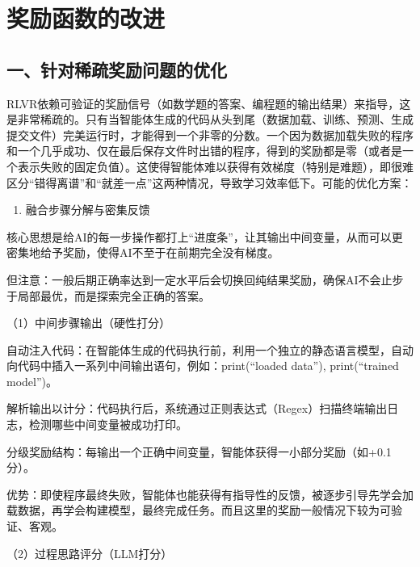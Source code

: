 \clearpage

\hypertarget{ux5956ux52b1ux51fdux6570ux7684ux6539ux8fdb}{%
\section{奖励函数的改进}\label{ux5956ux52b1ux51fdux6570ux7684ux6539ux8fdb}}

\hypertarget{ux4e00ux9488ux5bf9ux7a00ux758fux5956ux52b1ux95eeux9898ux7684ux4f18ux5316}{%
\subsection{一、针对稀疏奖励问题的优化}\label{ux4e00ux9488ux5bf9ux7a00ux758fux5956ux52b1ux95eeux9898ux7684ux4f18ux5316}}

RLVR依赖可验证的奖励信号（如数学题的答案、编程题的输出结果）来指导，这是非常稀疏的。只有当智能体生成的代码从头到尾（数据加载、训练、预测、生成提交文件）完美运行时，才能得到一个非零的分数。一个因为数据加载失败的程序和一个几乎成功、仅在最后保存文件时出错的程序，得到的奖励都是零（或者是一个表示失败的固定负值）。这使得智能体难以获得有效梯度（特别是难题），即很难区分``错得离谱''和``就差一点''这两种情况，导致学习效率低下。可能的优化方案：

\begin{enumerate}
\def\labelenumi{\arabic{enumi}.}
\tightlist
\item
  融合步骤分解与密集反馈
\end{enumerate}

核心思想是给AI的每一步操作都打上``进度条''，让其输出中间变量，从而可以更密集地给予奖励，使得AI不至于在前期完全没有梯度。

但注意：一般后期正确率达到一定水平后会切换回纯结果奖励，确保AI不会止步于局部最优，而是探索完全正确的答案。

（1）中间步骤输出（硬性打分）

自动注入代码：在智能体生成的代码执行前，利用一个独立的静态语言模型，自动向代码中插入一系列中间输出语句，例如：print(``loaded data''), print(``trained model'')。

解析输出以计分：代码执行后，系统通过正则表达式（Regex）扫描终端输出日志，检测哪些中间变量被成功打印。

分级奖励结构：每输出一个正确中间变量，智能体获得一小部分奖励（如+0.1分）。

优势：即使程序最终失败，智能体也能获得有指导性的反馈，被逐步引导先学会加载数据，再学会构建模型，最终完成任务。而且这里的奖励一般情况下较为可验证、客观。

（2）过程思路评分（LLM打分）

